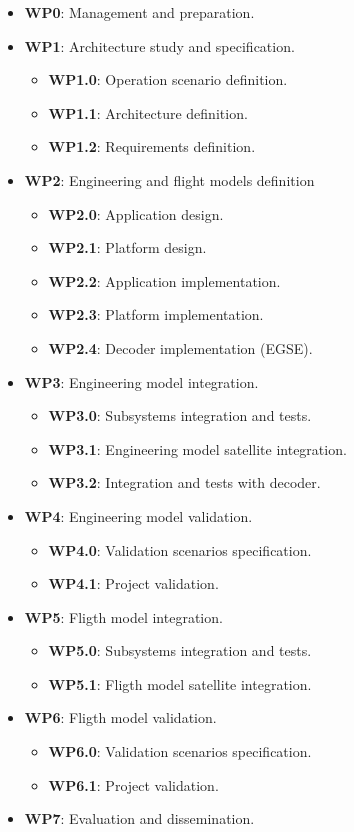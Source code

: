 \begin{itemize}
    \item \textbf{WP0}: Management and preparation.
    \item \textbf{WP1}: Architecture study and specification.
        \begin{itemize}
            \item \textbf{WP1.0}: Operation scenario definition.
            \item \textbf{WP1.1}: Architecture definition.
            \item \textbf{WP1.2}: Requirements definition.
        \end{itemize}
    \item \textbf{WP2}: Engineering and flight models definition
        \begin{itemize}
            \item \textbf{WP2.0}: Application design.
            \item \textbf{WP2.1}: Platform design.
            \item \textbf{WP2.2}: Application implementation.
            \item \textbf{WP2.3}: Platform implementation.
            \item \textbf{WP2.4}: Decoder implementation (EGSE).
        \end{itemize}
    \item \textbf{WP3}: Engineering model integration.
        \begin{itemize}
            \item \textbf{WP3.0}: Subsystems integration and tests.
            \item \textbf{WP3.1}: Engineering model satellite integration.
            \item \textbf{WP3.2}: Integration and tests with decoder.
        \end{itemize}
    \item \textbf{WP4}: Engineering model validation.
        \begin{itemize}
            \item \textbf{WP4.0}: Validation scenarios specification.
            \item \textbf{WP4.1}: Project validation.
        \end{itemize}
    \item \textbf{WP5}: Fligth model integration.
        \begin{itemize}
            \item \textbf{WP5.0}: Subsystems integration and tests.
            \item \textbf{WP5.1}: Fligth model satellite integration.
        \end{itemize}
    \item \textbf{WP6}: Fligth model validation.
        \begin{itemize}
            \item \textbf{WP6.0}: Validation scenarios specification.
            \item \textbf{WP6.1}: Project validation.
        \end{itemize}
    \item \textbf{WP7}: Evaluation and dissemination.
\end{itemize}
